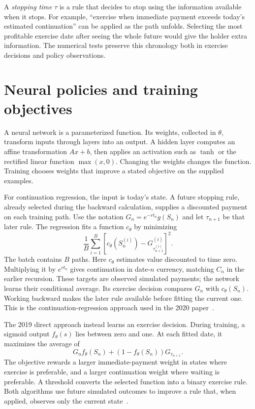 \documentclass[8pt]{strategynet-journal}
\begin{document}
\begin{SNcolumns}
A \emph{stopping time} $\tau$ is a rule that decides to stop using the
information available when it stops. For example, ``exercise when immediate
payment exceeds today's estimated continuation'' can be applied as the path
unfolds. Selecting the most profitable exercise date after seeing the whole
future would give the holder extra information. The numerical tests preserve
this chronology both in exercise decisions and policy observations.

\section{Neural policies and training objectives}
A neural network is a parameterized function. Its weights, collected in
$\theta$, transform inputs through layers into an output. A hidden layer
computes an affine transformation $Ax+b$, then applies an activation such
as $\tanh$ or the rectified linear function $\max(x,0)$. Changing the weights
changes the function. Training chooses weights that improve a stated objective
on the supplied examples.

For continuation regression, the input is today's state. A future stopping
rule, already selected during the backward calculation, supplies a discounted
payment on each training path. Use the notation
$G_n=e^{-rt_n}g(S_n)$ and let $\tau_{n+1}$ be that later rule. The regression
fits a function $c_\theta$ by minimizing
\[
 \frac1B\sum_{i=1}^{B}
 \left[c_\theta(S_n^{(i)})-G_{\tau_{n+1}^{(i)}}^{(i)}\right]^2.
\]
The batch contains $B$ paths. Here $c_\theta$ estimates value discounted to
time zero. Multiplying it by $e^{rt_n}$ gives continuation in date-$n$ currency,
matching $C_n$ in the earlier recursion. These targets are observed simulated payments;
the network learns their conditional average. Its exercise decision compares
$G_n$ with $c_\theta(S_n)$. Working backward makes the later rule available
before fitting the current one. This is the continuation-regression approach
used in the 2020 paper~\cite{american}.

The 2019 direct approach instead learns an exercise decision. During training,
a sigmoid output $f_\theta(s)$ lies between zero and one. At each fitted date,
it maximizes the average of
\[
 G_n f_\theta(S_n)+(1-f_\theta(S_n))G_{\tau_{n+1}}.
\]
The objective rewards a larger immediate-payment weight in states where
exercise is preferable, and a larger continuation weight where waiting is
preferable. A threshold converts the selected function into a binary exercise
rule. Both algorithms use future simulated outcomes to improve a rule that,
when applied, observes only the current state~\cite{stopping}.


\end{SNcolumns}
\end{document}

